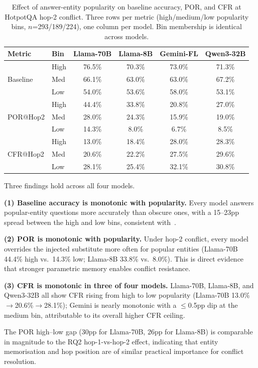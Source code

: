 \begin{table}[!ht]
\centering
\caption{Effect of answer-entity popularity on baseline accuracy, POR, and CFR at HotpotQA hop-2 conflict. Three rows per metric (high/medium/low popularity bins, $n$=293/189/224), one column per model. Bin membership is identical across models.}
\label{tab:popularity}
\small
\begin{tabular}{llcccc}
\toprule
\textbf{Metric} & \textbf{Bin} & \textbf{Llama-70B} & \textbf{Llama-8B} & \textbf{Gemini-FL} & \textbf{Qwen3-32B} \\
\midrule
\multirow{3}{*}{Baseline} & High & 76.5\% & 70.3\% & 73.0\% & 71.3\% \\
                          & Med  & 66.1\% & 63.0\% & 63.0\% & 67.2\% \\
                          & Low  & 54.0\% & 53.6\% & 58.0\% & 53.1\% \\
\midrule
\multirow{3}{*}{POR@Hop2} & High & 44.4\% & 33.8\% & 20.8\% & 27.0\% \\
                          & Med  & 28.0\% & 24.3\% & 15.9\% & 19.0\% \\
                          & Low  & 14.3\% & 8.0\%  & 6.7\%  & 8.5\% \\
\midrule
\multirow{3}{*}{CFR@Hop2} & High & 13.0\% & 18.4\% & 28.0\% & 28.3\% \\
                          & Med  & 20.6\% & 22.2\% & 27.5\% & 29.6\% \\
                          & Low  & 28.1\% & 25.4\% & 32.1\% & 30.8\% \\
\bottomrule
\end{tabular}
\end{table}

Three findings hold across all four models.

\textbf{(1) Baseline accuracy is monotonic with popularity.} Every model answers popular-entity questions more accurately than obscure ones, with a 15--23pp spread between the high and low bins, consistent with~\citet{mallen2023when}.

\textbf{(2) POR is monotonic with popularity.} Under hop-2 conflict, every model overrides the injected substitute more often for popular entities (Llama-70B 44.4\% high vs.\ 14.3\% low; Llama-8B 33.8\% vs.\ 8.0\%). This is direct evidence that stronger parametric memory enables conflict resistance.

\textbf{(3) CFR is monotonic in three of four models.} Llama-70B, Llama-8B, and Qwen3-32B all show CFR rising from high to low popularity (Llama-70B 13.0\%$\to$20.6\%$\to$28.1\%); Gemini is nearly monotonic with a $\leq$0.5pp dip at the medium bin, attributable to its overall higher CFR ceiling.

The POR high--low gap (30pp for Llama-70B, 26pp for Llama-8B) is comparable in magnitude to the RQ2 hop-1-vs-hop-2 effect, indicating that entity memorisation and hop position are of similar practical importance for conflict resolution.

